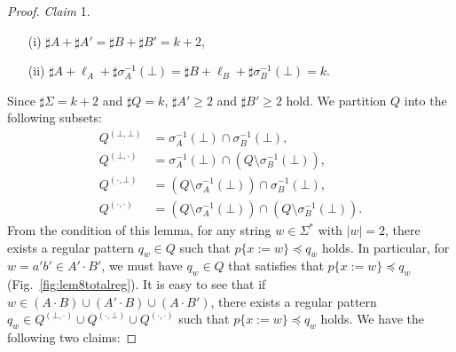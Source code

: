 \begin{proof}
\smallskip

\noindent
\textit{Claim} 1. 
\begin{enumerate}
  \item[(i)] $\sharp A + \sharp A' = \sharp B + \sharp B' = k + 2$,
  \item[(ii)] $\sharp A + \ell_{A} + \sharp \sigma_{A}^{-1}(\bot) = \sharp B + \ell_{B} + \sharp \sigma_{B}^{-1}(\bot) = k$.
\end{enumerate}

\smallskip

Since $\sharp \Sigma = k + 2$ and $\sharp Q = k$, $\sharp A' \geq 2$ and $\sharp B' \geq 2$ hold.
We partition $Q$ into the following subsets:
\begin{align*}
  Q^{(\bot,\bot)} & = \sigma_{A}^{-1}(\bot) \cap \sigma_{B}^{-1}(\bot),\\
  Q^{(\bot,\cdot)} & = \sigma_{A}^{-1}(\bot) \cap (Q\setminus \sigma_{B}^{-1}(\bot)),\\
  Q^{(\cdot,\bot)} & = (Q\setminus \sigma_{A}^{-1}(\bot)) \cap \sigma_{B}^{-1}(\bot),\\
  Q^{(\cdot,\cdot)} & = (Q\setminus \sigma_{A}^{-1}(\bot)) \cap (Q\setminus \sigma_{B}^{-1}(\bot)).
\end{align*}
From the condition of this lemma, for any string $w \in \Sigma^{\ast}$ with $|w|=2$, there exists a regular pattern $q_{w} \in Q$ such that $p \{ x:=w \} \preceq q_{w}$ holds.
In particular, for $w=a'b'\in A'\cdot B'$, we must have $q_{w} \in Q$ that satisfies that $p \{ x:=w \} \preceq q_{w}$ (Fig.~\ref{fig:lem8totalreg}).
It is easy to see that if $w \in (A\cdot B) \cup (A'\cdot B) \cup (A\cdot B')$, there exists a regular pattern $q_{w} \in Q^{(\bot,\cdot)} \cup Q^{(\cdot,\bot)} \cup Q^{(\cdot,\cdot)}$ such that $p \{ x:=w \} \preceq q_{w}$ holds.
We have the following two claims:
\smallskip


\end{proof}
